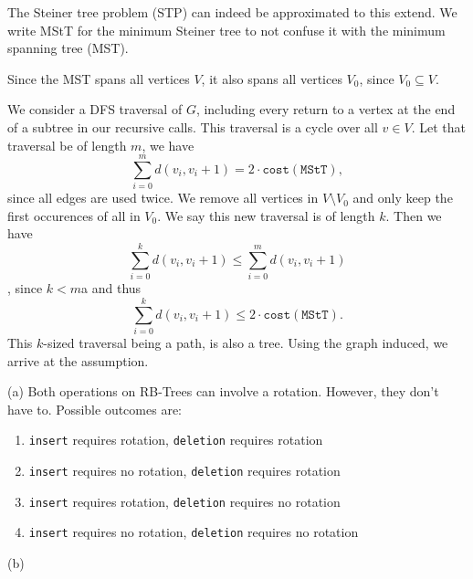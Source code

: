 \documentclass[12pt]{article}
\begin{document}
 

 

  The Steiner tree problem (STP) can indeed be approximated to this extend. We write MStT for the minimum Steiner tree to not confuse it with the minimum spanning tree (MST).
 
 Since the MST spans all vertices $V$, it also spans all vertices $V_0$, since $V_0\subseteq V$.
 
 We consider a DFS traversal of $G$, including every return to a vertex at the end of a subtree in our recursive calls. This traversal is a cycle over all $v\in V$. Let that traversal be of length $m$, we have \begin{equation}
 	\sum_{i=0}^{m} d(v_i, v_i+1) = 2\cdot \texttt{cost}(\texttt{MStT}),
 \end{equation} since all edges are used twice. We remove all vertices in $V\setminus V_0$ and only keep the first occurences of all in $V_0$. We say this new traversal is of length $k$. Then we have \begin{equation}
 	\sum_{i=0}^{k} d(v_i, v_i+1) \leq \sum_{i=0}^{m} d(v_i, v_i+1)
 \end{equation}, since $k<m$a and thus \begin{equation}
 	\sum_{i=0}^{k} d(v_i, v_i+1) \leq 2\cdot \texttt{cost}(\texttt{MStT}).
 \end{equation} This $k$-sized traversal being a path, is also a tree. Using the graph induced, we arrive at the assumption.

  (a) Both operations on RB-Trees can involve a rotation. However, they don't have to. Possible outcomes are: \begin{enumerate}
 \item \texttt{insert} requires rotation, \texttt{deletion} requires rotation
 \item \texttt{insert} requires no rotation, \texttt{deletion} requires rotation
 \item \texttt{insert} requires rotation, \texttt{deletion} requires no rotation
 \item \texttt{insert} requires no rotation, \texttt{deletion} requires no rotation
 \end{enumerate}

\vspace{.5cm}
\noindent (b)
 
  
\end{document}
